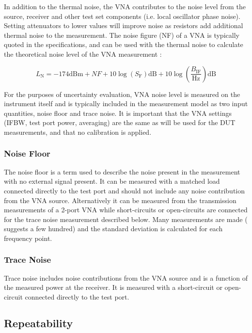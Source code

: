 \documentclass[../thesis/thesis.tex]{subfiles}
\begin{document}
In addition to the thermal noise, the VNA contributes to the noise level from the source, receiver and other test set components (i.e. local oscillator phase noise). Setting attenuators to lower values will improve noise as resistors add additional thermal noise to the measurement. The noise figure (NF) of a VNA is typically quoted in the specifications, and can be used with the thermal noise to calculate the theoretical noise level of the VNA measurement \cite{Hiebel_2008}:

\begin{equation}
	L_\textrm{N} = -174 \textrm{dBm} + NF + 10\log(S_\textrm{F})\textrm{dB} + 10\log\left(\frac{B_\textrm{IF}}{\textrm{Hz}}\right)\textrm{dB}
\end{equation}

For the purposes of uncertainty evaluation, VNA noise level is measured on the instrument itself and is typically included in the measurement model as two input quantities, noise floor and trace noise. It is important that the VNA settings (IFBW, test port power, averaging) are the same as will be used for the DUT measurements, and that no calibration is applied.

\subsubsection{Noise Floor}

The noise floor is a term used to describe the noise present in the measurement with no external signal present. It can be measured with a matched load connected directly to the test port and should not include any noise contribution from the VNA source. Alternatively it can be measured from the transmission measurements of a 2-port VNA while short-circuits or open-circuits are connected for the trace noise measurement described below. Many measurements are made (\cite{EURAMET_2011} suggests a few hundred) and the standard deviation is calculated for each frequency point.

\subsubsection{Trace Noise}

Trace noise includes noise contributions from the VNA source and is a function of the measured power at the receiver. It is measured with a short-circuit or open-circuit connected directly to the test port.

\subsection{Repeatability}
\end{document}

